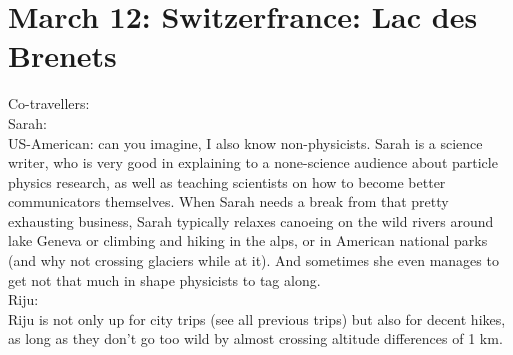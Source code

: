 \section{March 12: Switzerfrance: Lac des Brenets}
\label{2017:LacDesBrenets}

Co-travellers: \\
Sarah:\\
US-American: can you imagine, I also know non-physicists. Sarah is a science writer, who is very good in explaining to a none-science audience about particle physics research, as well as teaching scientists on how to become better communicators themselves. When Sarah needs a break from that pretty exhausting business, Sarah typically relaxes canoeing on the wild rivers around lake Geneva or climbing and hiking in the alps, or in American national parks (and why not crossing glaciers while at it). And sometimes she even manages to get not that much in shape physicists to tag along.\\

Riju:\\
Riju is not only up for city trips (see all previous trips) but also for decent hikes, as long as they don't go too wild by almost crossing altitude differences of 1 km. \\

